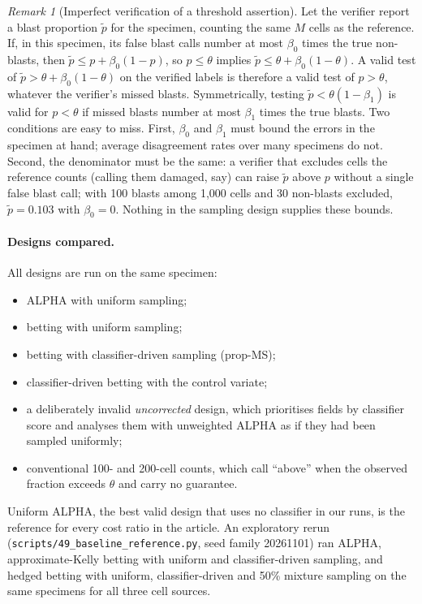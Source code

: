 \documentclass[11pt]{article}
\theoremstyle{remark}
\newtheorem{remark}{Remark}
\theoremstyle{definition}
\begin{document}
\begin{remark}[Imperfect verification of a threshold assertion]\label{rem:verif}
Let the verifier report a blast proportion $\tilde p$ for the specimen, counting the same $M$ cells as the reference. If, in this specimen, its false blast calls number at most $\beta_0$ times the true non-blasts, then $\tilde p\le p+\beta_0(1-p)$, so $p\le\theta$ implies $\tilde p\le\theta+\beta_0(1-\theta)$. A valid test of $\tilde p>\theta+\beta_0(1-\theta)$ on the verified labels is therefore a valid test of $p>\theta$, whatever the verifier's missed blasts. Symmetrically, testing $\tilde p<\theta(1-\beta_1)$ is valid for $p<\theta$ if missed blasts number at most $\beta_1$ times the true blasts. Two conditions are easy to miss. First, $\beta_0$ and $\beta_1$ must bound the errors in the specimen at hand; average disagreement rates over many specimens do not. Second, the denominator must be the same: a verifier that excludes cells the reference counts (calling them damaged, say) can raise $\tilde p$ above $p$ without a single false blast call; with 100 blasts among 1,000 cells and 30 non-blasts excluded, $\tilde p=0.103$ with $\beta_0=0$. Nothing in the sampling design supplies these bounds.
\end{remark}

\paragraph{Designs compared.} All designs are run on the same specimen:
\begin{itemize}
\item ALPHA with uniform sampling;
\item betting with uniform sampling;
\item betting with classifier-driven sampling (prop-MS);
\item classifier-driven betting with the control variate;
\item a deliberately invalid \emph{uncorrected} design, which prioritises fields by classifier score and analyses them with unweighted ALPHA as if they had been sampled uniformly;
\item conventional 100- and 200-cell counts, which call ``above'' when the observed fraction exceeds $\theta$ and carry no guarantee.
\end{itemize}
Uniform ALPHA, the best valid design that uses no classifier in our runs, is the reference for every cost ratio in the article. An exploratory rerun (\texttt{scripts/49\_baseline\_reference.py}, seed family 20261101) ran ALPHA, approximate-Kelly betting with uniform and classifier-driven sampling, and hedged betting with uniform, classifier-driven and 50\% mixture sampling on the same specimens for all three cell sources.
\end{document}
